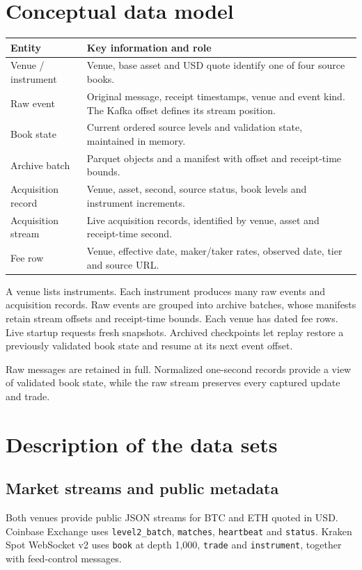 \documentclass[11pt,a4paper]{article}
\begin{document}
\section{Conceptual data model}
\begin{table}[h!]
\centering\small
\begin{tabularx}{\textwidth}{@{}L{35mm}Y@{}}
\toprule
\textbf{Entity} & \textbf{Key information and role}\\
\midrule
Venue / instrument & Venue, base asset and USD quote identify one of four source books.\\
Raw event & Original message, receipt timestamps, venue and event kind. The Kafka offset defines its stream position.\\
Book state & Current ordered source levels and validation state, maintained in memory.\\
Archive batch & Parquet objects and a manifest with offset and receipt-time bounds.\\
Acquisition record & Venue, asset, second, source status, book levels and instrument increments.\\
Acquisition stream & Live acquisition records, identified by venue, asset and receipt-time second.\\
Fee row & Venue, effective date, maker/taker rates, observed date, tier and source URL.\\
\bottomrule
\end{tabularx}
\end{table}

A venue lists instruments. Each instrument produces many raw events and acquisition records. Raw events are grouped into archive batches, whose manifests retain stream offsets and receipt-time bounds. Each venue has dated fee rows. Live startup requests fresh snapshots. Archived checkpoints let replay restore a previously validated book state and resume at its next event offset.

Raw messages are retained in full. Normalized one-second records provide a view of validated book state, while the raw stream preserves every captured update and trade.

\newpage
\section{Description of the data sets}
\subsection{Market streams and public metadata}
Both venues provide public JSON streams for BTC and ETH quoted in USD. Coinbase Exchange uses \texttt{level2\_batch}, \texttt{matches}, \texttt{heartbeat} and \texttt{status}. Kraken Spot WebSocket v2 uses \texttt{book} at depth 1,000, \texttt{trade} and \texttt{instrument}, together with feed-control messages.
\end{document}
